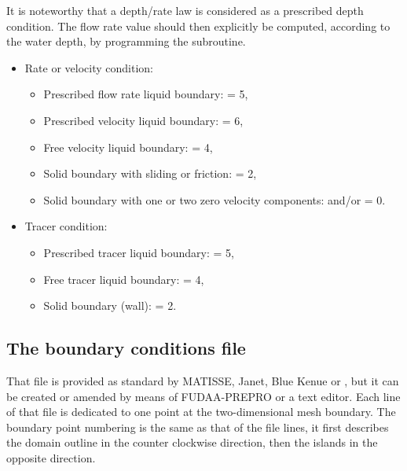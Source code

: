 It is noteworthy that a depth/rate law is considered as a prescribed depth
condition. The flow rate value should then explicitly be computed, according to
the water depth, by programming the  subroutine.

\begin{itemize}
\item Rate or velocity condition:

\begin{itemize}
\item Prescribed flow rate liquid boundary:  = 5,

\item Prescribed velocity liquid boundary:  = 6,

\item Free velocity liquid boundary:  = 4,

\item Solid boundary with sliding or friction:  = 2,

\item Solid boundary with one or two zero velocity components:  and/or
 = 0.
\end{itemize}

\item Tracer condition:

\begin{itemize}
\item Prescribed tracer liquid boundary:  = 5,

\item Free tracer liquid boundary:  = 4,

\item Solid boundary (wall):  = 2.
\end{itemize}
\end{itemize}


\subsection{The boundary conditions file}
\label{sec:bndfile}
That file is provided as standard by MATISSE, Janet, Blue Kenue or \stbtel, but
it can be created or amended by means of FUDAA-PREPRO or a text editor. Each
line of that file is dedicated to one point at the two-dimensional mesh
boundary. The boundary point numbering is the same as that of the file lines,
it first describes the domain outline in the counter clockwise direction, then
the islands in the opposite direction.

